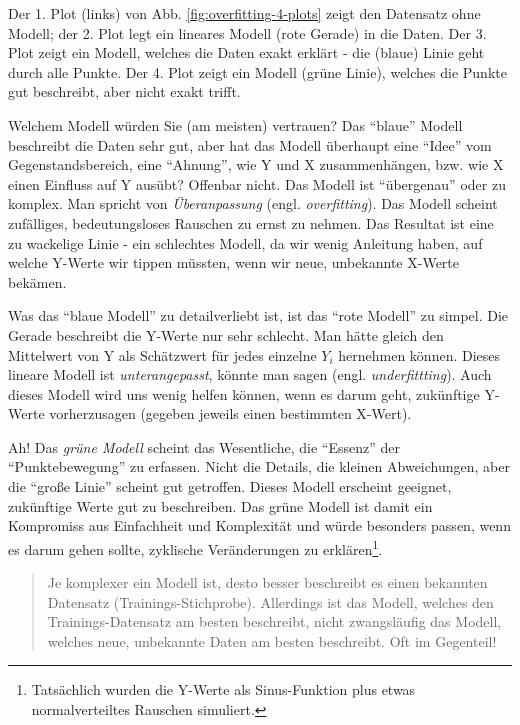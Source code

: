 \documentclass[12pt,ngerman,]{book}
\let\rmarkdownfootnote\footnote%
\def\footnote{\protect\rmarkdownfootnote}
\begin{document}
Der 1. Plot (links) von Abb. \ref{fig:overfitting-4-plots} zeigt den
Datensatz ohne Modell; der 2. Plot legt ein lineares Modell (rote
Gerade) in die Daten. Der 3. Plot zeigt ein Modell, welches die Daten
exakt erklärt - die (blaue) Linie geht durch alle Punkte. Der 4. Plot
zeigt ein Modell (grüne Linie), welches die Punkte gut beschreibt, aber
nicht exakt trifft.

Welchem Modell würden Sie (am meisten) vertrauen? Das ``blaue'' Modell
beschreibt die Daten sehr gut, aber hat das Modell überhaupt eine
``Idee'' vom Gegenstandsbereich, eine ``Ahnung'', wie Y und X
zusammenhängen, bzw. wie X einen Einfluss auf Y ausübt? Offenbar nicht.
Das Modell ist ``übergenau'' oder zu komplex. Man spricht von
\emph{Überanpassung} (engl.
\emph{overfitting}). Das Modell scheint zufälliges,
bedeutungsloses Rauschen zu ernst zu nehmen. Das Resultat ist eine zu
wackelige Linie - ein schlechtes Modell, da wir wenig Anleitung haben,
auf welche Y-Werte wir tippen müssten, wenn wir neue, unbekannte X-Werte
bekämen.

Was das ``blaue Modell'' zu detailverliebt ist, ist das ``rote Modell''
zu simpel. Die Gerade beschreibt die Y-Werte nur sehr schlecht. Man
hätte gleich den Mittelwert von Y als Schätzwert für jedes einzelne
\(Y_i\) hernehmen können. Dieses lineare Modell ist
\emph{unterangepasst}, könnte man sagen (engl.
\emph{underfittting}). Auch dieses Modell wird uns
wenig helfen können, wenn es darum geht, zukünftige Y-Werte
vorherzusagen (gegeben jeweils einen bestimmten X-Wert).

Ah! Das \emph{grüne Modell} scheint das Wesentliche, die ``Essenz'' der
``Punktebewegung'' zu erfassen. Nicht die Details, die kleinen
Abweichungen, aber die ``große Linie'' scheint gut getroffen. Dieses
Modell erscheint geeignet, zukünftige Werte gut zu beschreiben. Das
grüne Modell ist damit ein Kompromiss aus Einfachheit und Komplexität
und würde besonders passen, wenn es darum gehen sollte, zyklische
Veränderungen zu erklären\footnote{Tatsächlich wurden die Y-Werte als
  Sinus-Funktion plus etwas normalverteiltes Rauschen simuliert.}.

\begin{quote}
Je komplexer ein Modell ist, desto besser beschreibt es einen bekannten
Datensatz (Trainings-Stichprobe). Allerdings ist das Modell, welches den
Trainings-Datensatz am besten beschreibt, nicht zwangsläufig das Modell,
welches neue, unbekannte Daten am besten beschreibt. Oft im Gegenteil!
\end{quote}
\end{document}
